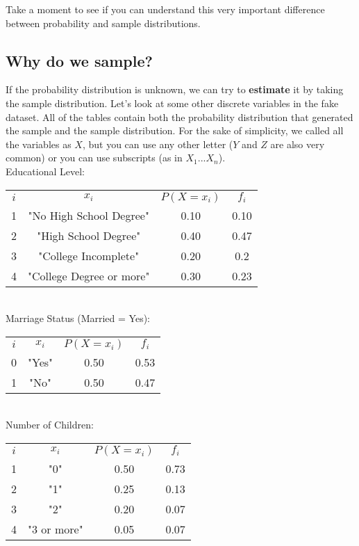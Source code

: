 \documentclass[11pt]{article}
\begin{document}
	Take a moment to see if you can understand this very important difference between probability and sample distributions.

	\subsection*{Why do we sample?}
	
	If the probability distribution is unknown, we can try to \textbf{estimate} it by taking the sample distribution. Let's look at some other discrete variables in the fake dataset. All of the tables contain both the probability distribution that generated the sample and the sample distribution. For the sake of simplicity, we called all the variables as $X$, but you can use any other letter ($Y$ and $Z$ are also very common) or you can use subscripts (as in $X_1 ... X_n$).\\
	
	Educational Level:
	
\begin{tabular}{|c|c|c|c|}
\hline
	$i$ & $x_i$ & $P(X=x_i)$ & $f_i$\\
	\cline{1-4}
	1 & "No High School Degree" & 0.10 & 0.10\\
	2 & "High School Degree" & 0.40 & 0.47\\
	3 & "College Incomplete" & 0.20 & 0.2\\
	4 & "College Degree or more" & 0.30 & 0.23\\	
\hline
\end{tabular}\newline\\

Marriage Status (Married = Yes):

\begin{tabular}{|c|c|c|c|}
\hline
	$i$ & $x_i$ & $P(X=x_i)$ & $f_i$\\
	\cline{1-4}
	0 & "Yes" & 0.50 & 0.53\\
	1 & "No" & 0.50 & 0.47\\
\hline
\end{tabular}\newline\\

Number of Children:

\begin{tabular}{|c|c|c|c|}
\hline
	$i$ & $x_i$ & $P(X=x_i)$ & $f_i$\\
	\cline{1-4}
	1 & "0" & 0.50 & 0.73\\
	2 & "1" & 0.25 & 0.13\\
	3 & "2" & 0.20 & 0.07\\
	4 & "3 or more" & 0.05 & 0.07\\	
\hline
\end{tabular}\newline\\
\end{document}
